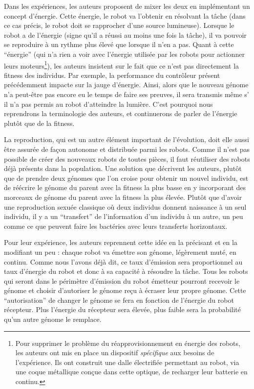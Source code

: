Dans les expériences, les auteurs proposent de mixer les deux en implémentant un concept d'énergie. Cette énergie, le robot va l'obtenir en résolvant la tâche (dans ce cas précis, le robot doit se rapprocher d'une source lumineuse). Lorsque le robot a de l'énergie (signe qu'il a réussi au moins une fois la tâche), il va pouvoir se reproduire à un rythme plus élevé que lorsque il n'en a pas. Quant à cette ``énergie'' (qui n'a rien a voir avec l'énergie utilisée par les robots pour actionner leurs moteurs\footnote{Pour supprimer le problème du réapprovisionnement en énergie des robots, les auteurs ont mis en place un dispositif \emph{spécifique} aux besoins de l'expérience. Ils ont construit une dalle électrifiée permettant au robot, via une coque métallique conçue dans cette optique, de recharger leur batterie en continu.}), les auteurs insistent sur le fait que ce n'est pas directement la fitness des individus. Par exemple, la performance du contrôleur présent précédemment  impacte sur la jauge d'énergie. Ainsi, alors que le nouveau génome n'a peut-être pas encore eu le temps de faire ses preuves, il sera transmis même s' il n'a pas permis au robot d'atteindre la lumière. C'est pourquoi nous reprendrons la terminologie des auteurs, et continuerons de parler de l'énergie plutôt que de la fitness.

La reproduction, qui est un autre élément important de l'évolution, doit elle aussi être assurée de façon autonome et distribuée parmi les robots. Comme il n'est pas possible de créer des nouveaux robots de toutes pièces, il faut réutiliser des robots déjà présents dans la population. Une solution que décrivent les auteurs, plutôt que de prendre deux génomes que l'on croise pour obtenir un nouvel individu, est de réécrire le génome du parent avec la fitness la plus basse en y incorporant des morceaux de génome du parent avec la fitness la plus élevée. Plutôt que d'avoir une reproduction sexuée classique où deux individus donnent naissance à un seul individu, il y a un ``transfert'' de l'information d'un individu à un autre, un peu comme ce que peuvent faire les bactéries avec leurs transferts horizontaux.

Pour leur expérience, les auteurs reprennent cette idée en la précisant et en la modifiant un peu : chaque robot va émettre son génome, légèrement muté, en continu. Comme nous l'avons déjà dit,  ce taux d'émission sera proportionnel au taux d'énergie du robot et donc à sa capacité à résoudre la tâche. Tous les robots qui seront dans le périmètre d'émission du robot émetteur pourront recevoir le génome et choisir d'autoriser le génome reçu à écraser leur propre génome. Cette ``autorisation'' de changer le génome se fera en fonction de l'énergie du robot récepteur. Plus l'énergie du récepteur sera élevée, plus faible sera la probabilité qu'un autre génome le remplace.

